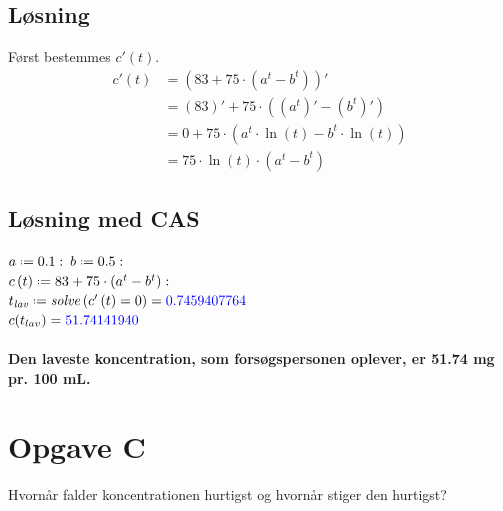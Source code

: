 \documentclass[a4paper, 11pt]{article}
\newcommand*{\defeq}{\mathrel{\vcenter{\baselineskip0.5ex \lineskiplimit0pt
                     \hbox{\scriptsize.}\hbox{\scriptsize.}}}%
                     =}
\begin{document}
\subsection*{Løsning}
Først bestemmes \(c'(t)\).\\
\begin{align*}
    c'(t)&=(83+75 \cdot (a^t-b^t))'\\
    &= (83)'+ 75 \cdot ((a^t)'-(b^t)')\\
    &= 0+ 75 \cdot (a^t\cdot \ln(t)-b^t\cdot \ln(t))\\
    &= 75\cdot \ln(t)\cdot (a^t-b^t)
\end{align*}
\subsection*{Løsning med CAS}
\(a \defeq 0.1\, \colon\, b \defeq 0.5 \, \colon\)\\
\(c\left(t\right)\defeq 83+75\cdot \left(a^{t}-b^{t}\right)\colon\)\\
\(t_{\mathit{lav}}\defeq \mathit{solve}\left(c'\left(t\right)=0\right)=\textcolor{blue}{0.7459407764}\)\\
\(c(t_{lav})=\textcolor{blue}{51.74141940}\)\\\\
\textbf{Den laveste koncentration, som forsøgspersonen oplever, er 51.74 mg pr. 100 mL.}
\section*{Opgave C} 
Hvornår falder koncentrationen hurtigst og hvornår stiger den hurtigst?
\end{document}
